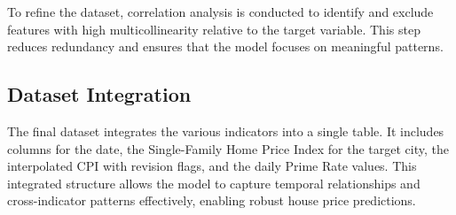 To refine the dataset, correlation analysis is conducted to identify and exclude features with high multicollinearity relative to the target variable. This step reduces redundancy and ensures that the model focuses on meaningful patterns.

\subsection{Dataset Integration}

The final dataset integrates the various indicators into a single table. It includes columns for the date, the Single-Family Home Price Index for the target city, the interpolated CPI with revision flags, and the daily Prime Rate values. This integrated structure allows the model to capture temporal relationships and cross-indicator patterns effectively, enabling robust house price predictions.